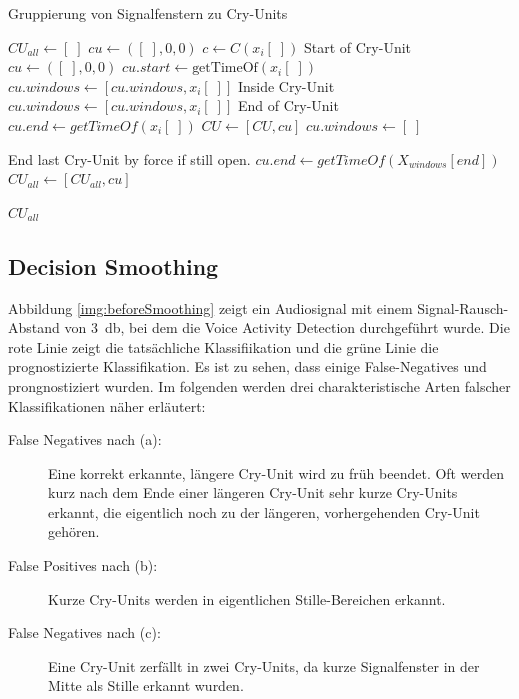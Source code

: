 \begin{algorithm}[h]
	\caption{Gruppierung von Signalfenstern zu Cry-Units}
	\label{alg:cryUnit}
	\begin{algorithmic}[1]
		\State $ CU_{all} \gets [\;]$
		\State $ cu\gets ([\;],0,0)$
				\State $ c \gets C(x_i[\;])$
				\State \Comment Start of Cry-Unit
						\State $cu\gets ([\;],0,0)$
						\State $cu.start \gets \text{getTimeOf}(x_i[\;])$
						\State $cu.windows \gets [cu.windows, x_i[\;]]$
				\EndIf
				\State \Comment Inside Cry-Unit
						\State $cu.windows \gets [cu.windows, x_i[\;]]$
				\EndIf
				\State \Comment End of Cry-Unit
						\State $cu.end \gets  getTimeOf(x_i[\;])$
						\State $CU \gets [CU, cu]$
						\State $cu.windows \gets [\;]$
				\EndIf
		\EndFor
		
		\State \Comment End last Cry-Unit by force if still open.
		\State $cu.end \gets  getTimeOf(X_{windows}[end])$
		\State $CU_{all} \gets [CU_{all}, cu]$
		\EndIf
		
		\Return $CU_{all}$
		
		\EndFunction
		
	\end{algorithmic}
\end{algorithm}

\subsection{Decision Smoothing}
\label{sec:smoothing}

Abbildung \ref{img:beforeSmoothing} zeigt ein Audiosignal mit einem Signal-Rausch-Abstand von \SI{3}{\decibel}, bei dem die Voice Activity Detection durchgeführt wurde. Die rote Linie zeigt die tatsächliche Klassifiikation und die grüne Linie die prognostizierte Klassifikation. Es ist zu sehen, dass einige False-Negatives und prongnostiziert wurden. Im folgenden werden drei charakteristische Arten falscher Klassifikationen näher erläutert:

\begin{description}
	\item [False Negatives nach (a): ] Eine korrekt erkannte, längere Cry-Unit wird zu früh beendet. Oft werden kurz nach dem Ende einer längeren Cry-Unit sehr kurze Cry-Units erkannt, die eigentlich noch zu der längeren, vorhergehenden Cry-Unit gehören.
	\item [False Positives nach (b): ] Kurze Cry-Units werden in eigentlichen Stille-Bereichen erkannt.
	\item [False Negatives nach (c): ] Eine Cry-Unit zerfällt in zwei Cry-Units, da kurze Signalfenster in der Mitte als Stille erkannt wurden.
\end{description}

